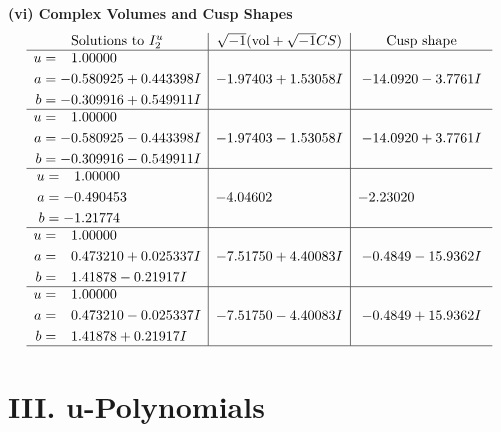 \documentclass[1p]{elsarticle_modified}
\theoremstyle{definition}
\newcommand{\I}{\sqrt{-1}}
\begin{document}
\newpage\flushleft \textbf{(vi) Complex Volumes and Cusp Shapes}
$$\begin{array}{c|c|c}  
\text{Solutions to }I^u_{2}& \I (\text{vol} + \sqrt{-1}CS) & \text{Cusp shape}\\
 \hline 
\begin{aligned}
u &= \phantom{-}1.00000\phantom{ +0.000000I} \\
a &= -0.580925 + 0.443398 I \\
b &= -0.309916 + 0.549911 I\end{aligned}
 & -1.97403 + 1.53058 I & -14.0920 - 3.7761 I \\ \hline\begin{aligned}
u &= \phantom{-}1.00000\phantom{ +0.000000I} \\
a &= -0.580925 - 0.443398 I \\
b &= -0.309916 - 0.549911 I\end{aligned}
 & -1.97403 - 1.53058 I & -14.0920 + 3.7761 I \\ \hline\begin{aligned}
u &= \phantom{-}1.00000\phantom{ +0.000000I} \\
a &= -0.490453\phantom{ +0.000000I} \\
b &= -1.21774\phantom{ +0.000000I}\end{aligned}
 & -4.04602\phantom{ +0.000000I} & -2.23020\phantom{ +0.000000I} \\ \hline\begin{aligned}
u &= \phantom{-}1.00000\phantom{ +0.000000I} \\
a &= \phantom{-}0.473210 + 0.025337 I \\
b &= \phantom{-}1.41878 - 0.21917 I\end{aligned}
 & -7.51750 + 4.40083 I & -0.4849 - 15.9362 I \\ \hline\begin{aligned}
u &= \phantom{-}1.00000\phantom{ +0.000000I} \\
a &= \phantom{-}0.473210 - 0.025337 I \\
b &= \phantom{-}1.41878 + 0.21917 I\end{aligned}
 & -7.51750 - 4.40083 I & -0.4849 + 15.9362 I\\
 \hline 
 \end{array}$$\newpage
\newpage\renewcommand{\arraystretch}{1}
\centering \section*{ III. u-Polynomials}
\end{document}
